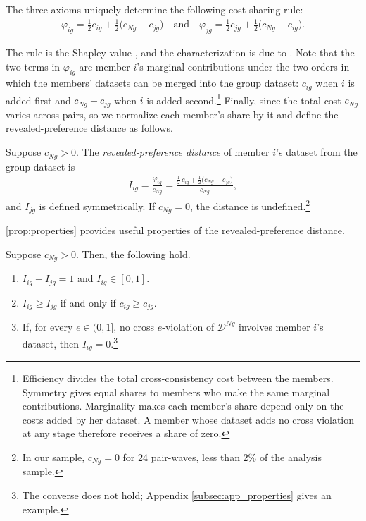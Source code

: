 \documentclass[11 pt]{article}
\begin{document}
\begin{proposition}\label{prop:shapley}
The three axioms uniquely determine the following cost-sharing rule:
\begin{align*}
\varphi_{ig} = \tfrac{1}{2} c_{ig} + \tfrac{1}{2}\bigl( c_{Ng} - c_{jg} \bigr) \quad \text{and} \quad \varphi_{jg} = \tfrac{1}{2} c_{jg} + \tfrac{1}{2}\bigl( c_{Ng} - c_{ig} \bigr).
\end{align*}
\end{proposition}

The rule is the Shapley value \citep{shapley1953value}, and the characterization is due to \citet{young1985monotonic}. Note that the two terms in $\varphi_{ig}$ are member $i$'s marginal contributions under the two orders in which the members' datasets can be merged into the group dataset: $c_{ig}$ when $i$ is added first and $c_{Ng} - c_{jg}$ when $i$ is added second.\footnote{Efficiency divides the total cross-consistency cost between the members. Symmetry gives equal shares to members who make the same marginal contributions. Marginality makes each member's share depend only on the costs added by her dataset. A member whose dataset adds no cross violation at any stage therefore receives a share of zero.} Finally, since the total cost $c_{Ng}$ varies across pairs, so we normalize each member's share by it and define the revealed-preference distance as follows.

\begin{definition}\label{def:index}\normalfont
Suppose $c_{Ng} > 0$. The \emph{revealed-preference distance} of member $i$'s dataset from the group dataset is
\begin{align}\label{eqn:I_ig}
I_{ig} = \frac{\varphi_{ig}}{c_{Ng}} = \frac{\tfrac{1}{2}\, c_{ig} + \tfrac{1}{2}\bigl( c_{Ng} - c_{jg} \bigr)}{c_{Ng}},
\end{align}
and $I_{jg}$ is defined symmetrically. If $c_{Ng} = 0$, the distance is undefined.\footnote{In our sample, $c_{Ng} = 0$ for 24 pair-waves, less than 2\% of the analysis sample.}
\end{definition}

\autoref{prop:properties} provides useful properties of the revealed-preference distance.

\begin{proposition}\label{prop:properties}
Suppose $c_{Ng} > 0$. Then, the following hold.
\begin{enumerate}
\item[(i)] $I_{ig} + I_{jg} = 1$ and $I_{ig} \in [0,1]$.
\item[(ii)] $I_{ig} \geq I_{jg}$ if and only if $c_{ig} \geq c_{jg}$.
\item[(iii)] If, for every $e \in (0,1]$, no cross $e$-violation of $\mathcal{D}^{Ng}$ involves member $i$'s dataset, then $I_{ig} = 0$.\footnote{The converse does not hold; Appendix \autoref{subsec:app_properties} gives an example.}
\end{enumerate}
\end{proposition}
\end{document}
